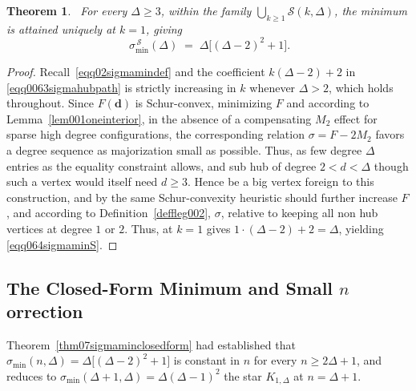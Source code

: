\documentclass[12pt]{amsart}
\newtheorem{theorem}{Theorem}[section]
\begin{document}
\begin{theorem}~\label{thm06hubcountmonotone}
For every $\Delta\geqslant 3$, within the family
$\bigcup_{k\ge1}\mathcal S(k,\Delta)$, the minimum is attained uniquely at $k=1$, giving
\begin{equation}~\label{eqq064sigmaminS}
\sigma_{\min}^{\,\mathcal S}(\Delta) \;=\; \Delta\big[(\Delta-2)^2+1\big].
\end{equation}
\end{theorem}
\begin{proof}
Recall~\eqref{eqq02sigmamindef} and the coefficient $k(\Delta-2)+2$ in \eqref{eqq0063sigmahubpath} is strictly
increasing in $k$ whenever $\Delta>2$, which holds throughout. Since $F(\mathbf d)$ is Schur-convex,
minimizing $F$ and according to Lemma~\ref{lem001oneinterior}, in the absence of a compensating $M_2$ effect for
sparse high degree configurations, the corresponding relation $\sigma=F-2M_2$ favors a degree sequence as majorization small as possible. Thus, as few degree $\Delta$ entries as the equality constraint allows, and sub hub of degree $2<d<\Delta$  though such a vertex would itself need
$d\geqslant 3$. Hence be a big vertex foreign to this construction, and by the
same Schur-convexity heuristic should further increase $F$, and according to Definition~\ref{deffleg002}, $\sigma$, relative to keeping all non hub vertices at degree $1$ or $2$.  Thus, at
$k=1$ gives $1\cdot(\Delta-2)+2=\Delta$, yielding
\eqref{eqq064sigmaminS}.
\end{proof}



\subsection{The Closed-Form Minimum and Small \texorpdfstring{$n$} Correction}
Theorem~\ref{thm07sigmaminclosedform} had established that $\sigma_{\min}(n,\Delta)=\Delta\big[(\Delta-2)^2+1\big]$ is
 constant in $n$  for every $n\ge2\Delta+1$, and reduces to
$\sigma_{\min}(\Delta+1,\Delta)=\Delta(\Delta-1)^2$ the star $K_{1,\Delta}$ at $n=\Delta+1$.
\end{document}
